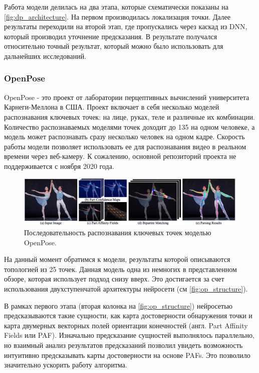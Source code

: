 Работа модели делилась на два этапа, которые схематически показаны на \autoref{fig:dp_architecture}. На первом производилась локализация точки. Далее результаты переходили на второй этап, где пропускались через каскад из DNN, который производил уточнение предсказания. В результате получался относительно точный результат, который можно было использовать для дальнейших исследований.


\subsubsection*{OpenPose}

OpenPose - это проект от лаборатории перцептивных вычислений университета Карнеги-Меллона в США. Проект включает в себя несколько моделей распознавания ключевых точек: на лице, руках, теле и различные их комбинации. Количество распознаваемых моделями точек доходит до 135 на одном человеке, а модель может распознавать сразу несколько человек на одном кадре. Скорость работы модели позволяет использовать ее для распознавания видео в реальном времени через веб-камеру. К сожалению, основной репозиторий проекта не поддерживается с ноября 2020 года.

\begin{figure}[h]
	\centering
	\includegraphics[width=\textwidth]{./images/OpenPose/structure}
	\caption{Последовательность распознавания ключевых точек моделью OpenPose. \cite{OpenPose}}
	\label{fig:op_structure}
\end{figure}

На данный момент обратимся к модели, результаты которой описываются топологией из 25 точек. Данная модель одна из немногих в представленном обзоре, которая использует подход снизу вверх. Это достигается за счет использования двухступенчатой архитектуры нейросети (см \autoref{fig:op_structure}).

В рамках первого этапа (вторая колонка на \autoref{fig:op_structure}) нейросетью предсказываются такие сущности, как карта достоверности обнаружения точки и карта двумерных векторных полей ориентации конечностей (англ. Part Affinity Fields или PAF). Изначально предсказание сущностей выполнялось параллельно, но взаимный анализ результатов предсказаний позволил увидеть возможность интуитивно предсказывать карты достоверности на основе PAFs. Это позволило значительно ускорить работу алгоритма.

